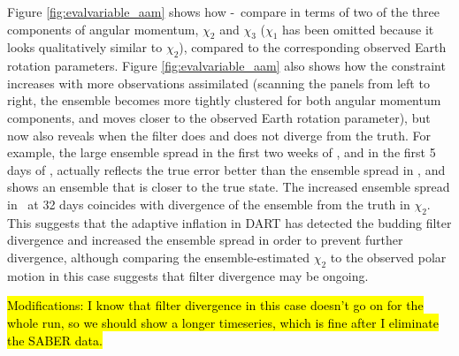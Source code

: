 Figure \ref{fig:evalvariable_aam} shows how  \WACCMNODA-\WACCMGLOBAL~compare in terms of two of the three components of angular momentum, $\chi_2$ and $\chi_3$ ($\chi_1$ has been omitted because it looks qualitatively similar to $\chi_2$),  
compared to the corresponding observed Earth rotation parameters. 
Figure  \ref{fig:evalvariable_aam} also shows how the constraint increases with more observations assimilated (scanning the panels from left to right, the ensemble becomes more tightly clustered for both angular momentum components, and moves closer to the observed Earth rotation parameter), but now also reveals when the filter does and does not diverge from the truth.  
For example, the large ensemble spread in the first two weeks of \WACCMTROPICS, and in the first 5 days of \WACCMGLOBAL, actually reflects the true error better than the ensemble spread in \WACCMNODA, and shows an ensemble that is closer to the true state. 
The increased ensemble spread in \WACCMGLOBAL~at 32 days coincides with divergence of the ensemble from the truth in $\chi_2$. 
This suggests that the adaptive inflation in DART has detected the budding filter divergence and increased the ensemble spread in order to prevent further divergence, although comparing the ensemble-estimated $\chi_2$ to the observed polar motion in this case suggests that filter divergence may be ongoing.  

\hl{Modifications: I know that filter divergence in this case doesn't go on for the whole run, so we should show a longer timeseries, which is fine after I eliminate the SABER data.}
